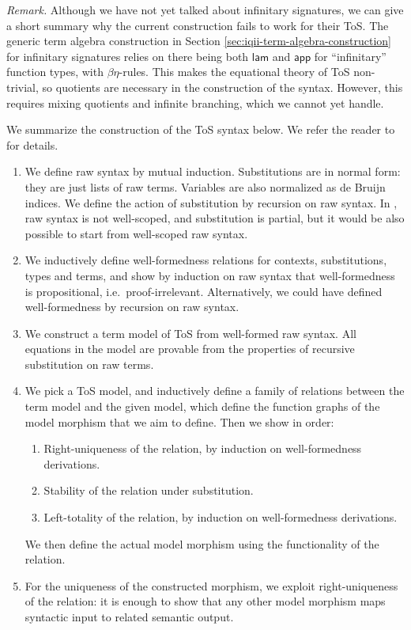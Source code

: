 \documentclass[12pt,a4paper,twoside,openany]{book}
\theoremstyle{remark}
\theoremstyle{definition}
\theoremstyle{theorem}
\newcommand{\ms}[1]{\mathsf{#1}}
\newcommand{\app}{\ms{app}}
\newcommand{\lam}{\ms{lam}}
\begin{document}
\emph{Remark.} Although we have not yet talked about infinitary signatures, we
can give a short summary why the current construction fails to work for their
ToS.  The generic term algebra construction in Section
\ref{sec:iqii-term-algebra-construction} for infinitary signatures relies on
there being both $\lam$ and $\app$ for ``infinitary'' function types, with
$\beta\eta$-rules. This makes the equational theory of ToS non-trivial, so
quotients are necessary in the construction of the syntax. However, this
requires mixing quotients and infinite branching, which we cannot yet handle.

We summarize the construction of the ToS syntax below. We refer the reader to
\cite{ind-ind-reduction} for details.

\begin{enumerate}
\item We define raw syntax by mutual induction. Substitutions are in normal form:
      they are just lists of raw terms. Variables are also normalized as de Bruijn indices.
      We define the action of substitution by recursion on raw syntax. In \cite{ind-ind-reduction},
      raw syntax is not well-scoped, and substitution is partial, but it would be also possible
      to start from well-scoped raw syntax.
\item We inductively define well-formedness relations for contexts,
      substitutions, types and terms, and show by induction on raw syntax that
      well-formedness is propositional, i.e.\ proof-irrelevant. Alternatively, we
      could have defined well-formedness by recursion on raw syntax.
\item We construct a term model of ToS from well-formed raw syntax. All equations in the model
      are provable from the properties of recursive substitution on raw terms.
\item We pick a ToS model, and inductively define a family of relations between
      the term model and the given model, which define the function graphs of the
      model morphism that we aim to define. Then we show in order:
      \begin{enumerate}
        \item Right-uniqueness of the relation, by induction on well-formedness derivations.
        \item Stability of the relation under substitution.
        \item Left-totality of the relation, by induction on well-formedness derivations.
      \end{enumerate}
      We then define the actual model morphism using the functionality of the relation.
\item For the uniqueness of the constructed morphism, we exploit
      right-uniqueness of the relation: it is enough to show that any other model
      morphism maps syntactic input to related semantic output.
\end{enumerate}
\end{document}

